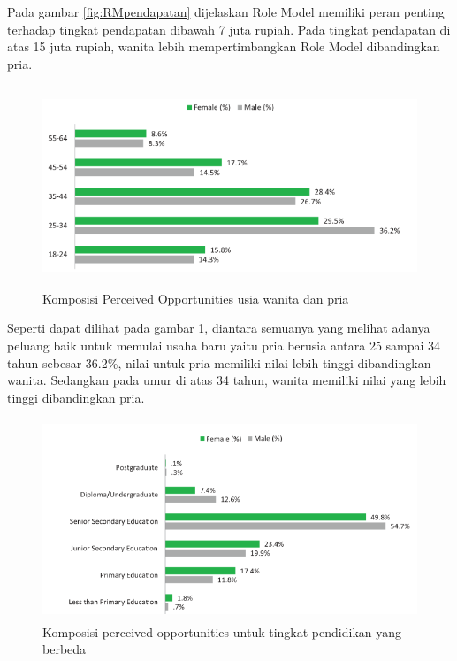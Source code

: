 Pada gambar \ref{fig:RMpendapatan} dijelaskan Role Model memiliki peran penting terhadap tingkat pendapatan dibawah 7 juta rupiah. Pada tingkat pendapatan di atas 15 juta rupiah, wanita lebih mempertimbangkan Role Model dibandingkan pria.

\begin{figure} [H]
	\centering  
	\includegraphics[width=12cm, height=6cm]{umurPO2013} 
	\caption[Komposisi Perceived Opportunities usia wanita dan pria]{Komposisi Perceived Opportunities usia wanita dan pria} 
	\label{fig:POUmur} 
\end{figure} 

Seperti dapat dilihat pada gambar \ref{fig:POUmur}, diantara semuanya yang melihat adanya peluang baik untuk memulai usaha baru yaitu pria berusia antara 25 sampai 34 tahun sebesar 36.2\%, nilai untuk pria memiliki nilai lebih tinggi dibandingkan wanita. Sedangkan pada umur di atas 34 tahun, wanita memiliki nilai yang lebih tinggi dibandingkan pria.

\begin{figure} [H]
	\centering  
	\includegraphics[width=14cm, height=6cm]{pendidikanPO2013} 
	\caption[Komposisi perceived opportunities untuk tingkat pendidikan yang berbeda]{Komposisi perceived opportunities untuk tingkat pendidikan yang berbeda} 
	\label{fig:POpendidikan} 
\end{figure}  


